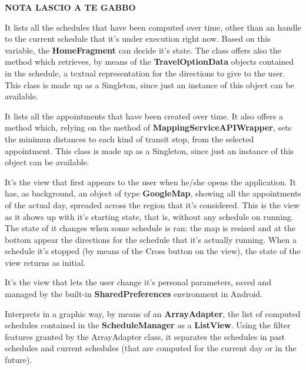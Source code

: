 \textbf{NOTA LASCIO A TE GABBO}





 
 
 
 

It lists all the schedules that have been computed over time, other than an handle to the current schedule that it's under execution right now. Based on this variable, the \textbf{HomeFragment} can decide it's state. The class offers also the method  which retrieves, by means of the \textbf{TravelOptionData} objects contained in the schedule, a textual representation for the directions to give to the user.
This class is made up as a Singleton, since just an instance of this object can be available.

It lists all the appointments that have been created over time. It also offers a method which, relying on the  method of \textbf{MappingServiceAPIWrapper}, sets the minimun distances to each kind of transit stop, from the selected appointment.
This class is made up as a Singleton, since just an instance of this object can be available.

It's the view that first appears to the user when he/she opens the application. It has, as background, an object of type \textbf{GoogleMap}, showing all the appointments of the actual day, spreaded across the region that it's considered. This is the view as it shows up with it's starting state, that is, without any schedule on running. The state of it changes when some schedule is ran: the map is resized and at the bottom appear the directions for the schedule that it's actually running. When a schedule it's stopped (by means of the Cross button on the view), the state of the view returns as initial.

It's the view that lets the user change it's personal parameters, saved and managed by the built-in \textbf{SharedPreferences} environment in Android.

Interprets in a graphic way, by means of an \textbf{ArrayAdapter}, the list of computed schedules contained in the \textbf{ScheduleManager} as a \textbf{ListView}. Using the filter features granted by the ArrayAdapter class, it separates the schedules in past schedules and current schedules (that are computed for the current day or in the future). 

